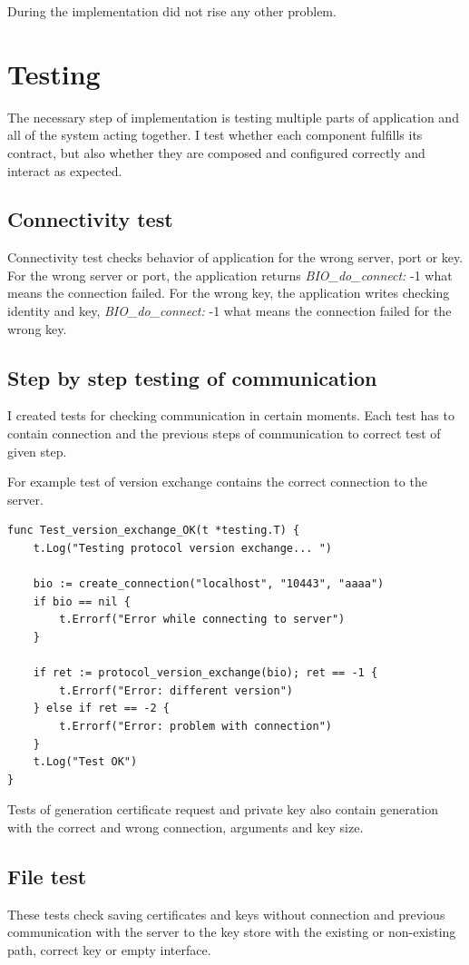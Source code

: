 \documentclass[
  digital, %
  notable,   %
  lof,     %
  lot,     %
]{fithesis3}
\begin{document}
During the implementation did not rise any other problem.

\section{Testing}

The necessary step of implementation is testing multiple parts of application and all of the 
system acting together. I test whether each component fulfills its contract, but also whether they 
are composed and configured correctly and interact as expected. 

\subsection{Connectivity test}

Connectivity test checks behavior of application for the wrong server, port or key. For the wrong 
server or port, the application returns \textit{BIO\_do\_connect:} -1 what means the connection 
failed. For the wrong key, the application writes checking identity and key, 
\textit{BIO\_do\_connect:} -1 what means the connection failed for the wrong key.

\subsection{Step by step testing of communication}
I created tests for checking communication in certain moments. Each test has to contain connection 
and the previous steps of communication to correct test of given step.

For example test of version exchange contains the correct connection to the server.
\begin{lstlisting}
func Test_version_exchange_OK(t *testing.T) {
	t.Log("Testing protocol version exchange... ")
		
	bio := create_connection("localhost", "10443", "aaaa")
	if bio == nil {
		t.Errorf("Error while connecting to server")
	}
	
	if ret := protocol_version_exchange(bio); ret == -1 {
		t.Errorf("Error: different version")
	} else if ret == -2 {
		t.Errorf("Error: problem with connection")
	} 
	t.Log("Test OK")
}
\end{lstlisting}

Tests of generation certificate request and private key also contain generation with the correct 
and wrong connection, arguments and key size.

\subsection{File test}
These tests check saving certificates and keys without connection and previous communication with 
the server to the key store with the existing or non-existing path, correct key or empty 
interface. 
\end{document}
